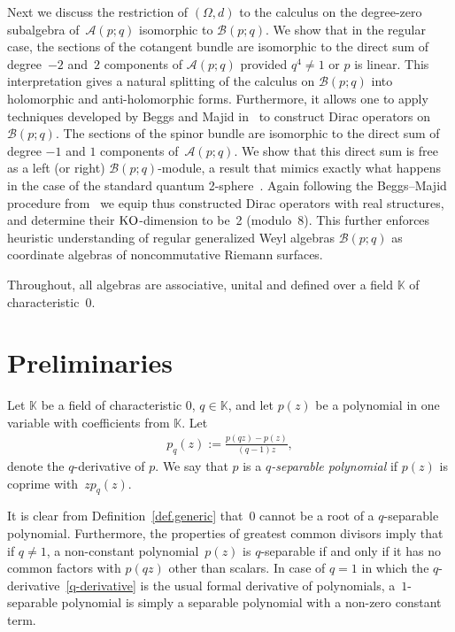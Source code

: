 \documentclass[pdftex]{sigma}
\numberwithin{equation}{section}
\def\Weyl#1#2{{\mathcal{B}}(#1;#2)}
\def\AWeyl#1#2{{\mathcal{A}}(#1;#2)}
\begin{document}
Next we discuss the restriction of $(\Omega, d)$ to the calculus on the degree-zero subalgebra of~$\AWeyl p q$ isomorphic to $\Weyl p q$. We show that in the regular case, the sections of the cotangent bundle are isomorphic to the direct sum of degree~$-2$ and~$2$ components of $\AWeyl p q$ provided $q^4\neq 1$ or $p$ is linear. This interpretation gives a natural splitting of the calculus on $\Weyl p q$ into holomorphic and anti-holomorphic forms. Furthermore, it allows one to apply techniques developed by Beggs and Majid in~\cite{BegMaj:spe} to construct Dirac operators on $\Weyl p q$. The sections of the spinor bundle are isomorphic to the direct sum of degree $-1$ and $1$ components of~$\AWeyl p q$. We show that this direct sum is free as a left (or right) $\Weyl p q$-module, a result that mimics exactly what happens in the case of the standard quantum 2-sphere~\cite{Maj:Rie}. Again following the Beggs--Majid procedure from~\cite{BegMaj:spe} we equip thus constructed Dirac operators with real structures, and determine their ${\rm KO}$-dimension to be~2 (modulo~8). This further enforces heuristic understanding of regular generalized Weyl algebras $\Weyl p q$ as coordinate algebras of noncommutative Riemann surfaces.

Throughout, all algebras are associative, unital and def\/ined over a f\/ield ${\mathbb K}$ of characteris\-tic~0.

\section{Preliminaries}\label{sec.prem}
\begin{Definition}\label{def.generic}
Let ${\mathbb K}$ be a f\/ield of characteristic 0, $q\in {\mathbb K}$, and let $p(z)$ be a polynomial in one variable with coef\/f\/icients from ${\mathbb K}$. Let
\begin{gather}\label{q-derivative}
p_q(z) := \frac{p(qz) -p(z)}{(q -1)z},
\end{gather}
denote the $q$-derivative of $p$. We say that $p$ is a {\em $q$-separable polynomial} if $p(z)$ is coprime with~$zp_q(z)$.
\end{Definition}

It is clear from Def\/inition~\ref{def.generic} that~0 cannot be a root of a $q$-separable polynomial. Furthermore, the properties of greatest common divisors imply that if $q\neq1$, a non-constant polynomial~$p(z)$ is $q$-separable if and only if it has no common factors with $p(qz)$ other than scalars. In case of $q=1$ in which the $q$-derivative~\eqref{q-derivative} is the usual formal derivative of polynomials, a~$1$-separable polynomial is simply a separable polynomial with a non-zero constant term.
\end{document}
